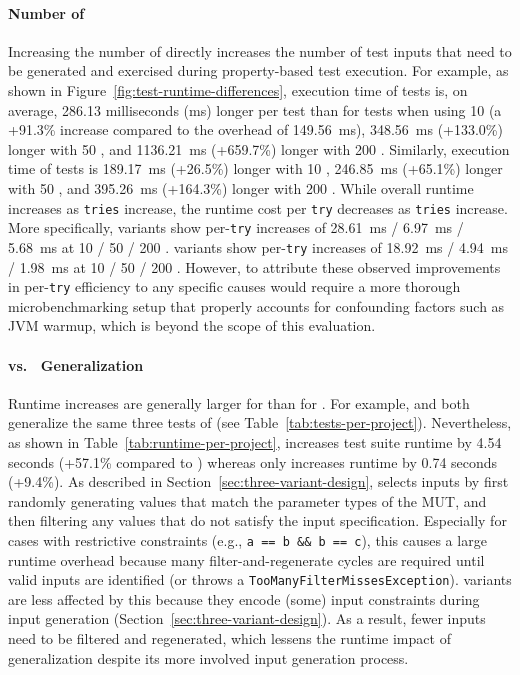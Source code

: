 \paragraph{Number of \tries{}}

Increasing the number of \tries{}
directly increases the number of test inputs
that need to be generated and exercised
during property-based test execution.
For example, as shown in Figure~\ref{fig:test-runtime-differences},
execution time of \VariantNaive{} tests
is, on average, 286.13 milliseconds (ms) longer per test
than for \VariantOriginal{} tests when using 10 \tries{}
(a +91.3\% increase compared to the \VariantBaseline{} overhead of 149.56~ms),
348.56~ms (+133.0\%) longer with 50 \tries{},
and 1136.21~ms (+659.7\%) longer with 200 \tries{}.
Similarly, execution time of \VariantImproved{} tests
is 189.17~ms (+26.5\%) longer with 10 \tries{},
246.85~ms (+65.1\%) longer with 50 \tries{},
and 395.26~ms (+164.3\%) longer with 200 \tries{}.
While overall runtime increases as \texttt{tries} increase,
the runtime cost per \texttt{try}
decreases as \texttt{tries} increase.
More specifically, \VariantNaive{} variants
show per-\texttt{try} increases
of 28.61~ms / 6.97~ms / 5.68~ms at 10 / 50 / 200 \tries{}.
\VariantImproved{} variants show
per-\texttt{try} increases 
of 18.92~ms / 4.94~ms / 1.98~ms at 10 / 50 / 200 \tries{}.
However, to attribute these observed
improvements in per-\texttt{try} efficiency to any specific causes
would require a more thorough microbenchmarking setup
that properly accounts for confounding factors such as JVM warmup,
which is beyond the scope of this evaluation.

\paragraph{\VariantNaive{} vs.\ \VariantImproved{} Generalization}

Runtime increases are generally larger
for \VariantNaive{} than for \VariantImproved{}.
For example, \VariantNaiveC{} and \VariantImprovedC{}
both generalize the same three tests of \DatasetCommonsDev{}
(see Table~\ref{tab:tests-per-project}).
Nevertheless, as shown in Table~\ref{tab:runtime-per-project},
\VariantNaiveC{} increases test suite runtime by 4.54 seconds
(+57.1\% compared to \VariantOriginal{})
whereas \VariantImprovedC{} only increases runtime by 0.74 seconds (+9.4\%).
As described in Section~\ref{sec:three-variant-design},
\VariantNaive{} selects inputs
by first randomly generating values
that match the parameter types of the MUT,
and then filtering any values that do not satisfy the input specification.
Especially for cases with restrictive constraints (e.g., \texttt{a~==~b~\&\&~b~==~c}),
this causes a large runtime overhead
because many filter-and-regenerate cycles are required
until valid inputs are identified
(or \ToolJqwik{} throws a \texttt{Too\-Many\-Filter\-Misses\-Exception}).
\VariantImproved{} variants are less affected by this
because they encode (some) input constraints
during input generation
(Section~\ref{sec:three-variant-design}).
As a result, fewer inputs need to be filtered and regenerated,
which lessens the runtime impact of \VariantImproved{} generalization
despite its more involved input generation process.

